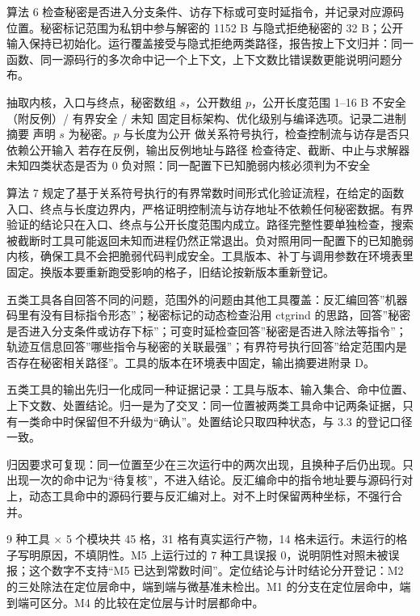 算法 6 检查秘密是否进入分支条件、访存下标或可变时延指令，并记录对应源码位置。秘密标记范围为私钥中参与解密的 1152 B 与隐式拒绝秘密的 32 B；公开输入保持已初始化。运行覆盖接受与隐式拒绝两类路径，报告按上下文归并：同一函数、同一源码行的多次命中记一个上下文，上下文数比错误数更能说明问题分布。

\begin{algorithm}[H]
\caption{Binsec 有界常数时间检查}
\label{alg:binsec}
\begin{algorithmic}[1]
\Require 抽取内核，入口与终点，秘密数组 $s$，公开数组 $p$，公开长度范围 1--16 B
\Ensure 不安全（附反例）/ 有界安全 / 未知
\State 固定目标架构、优化级别与编译选项。记录二进制摘要
\State 声明 $s$ 为秘密。$p$ 与长度为公开
\State 做关系符号执行，检查控制流与访存是否只依赖公开输入
\State 若存在反例，输出反例地址与路径
\State 检查待定、截断、中止与求解器未知四类状态是否为 0
\State 负对照：同一配置下已知脆弱内核必须判为不安全
\end{algorithmic}
\end{algorithm}

算法 7 规定了基于关系符号执行的有界常数时间形式化验证流程，在给定的函数入口、终点与长度边界内，严格证明控制流与访存地址不依赖任何秘密数据。有界验证的结论只在入口、终点与公开长度范围内成立。路径完整性要单独检查，搜索被截断时工具可能返回未知而进程仍然正常退出。负对照用同一配置下的已知脆弱内核，确保工具不会把脆弱代码判成安全。工具版本、补丁与调用参数在环境表里固定。换版本要重新跑受影响的格子，旧结论按新版本重新登记。

五类工具各自回答不同的问题，范围外的问题由其他工具覆盖：反汇编回答”机器码里有没有目标指令形态”；秘密标记的动态检查沿用 ctgrind 的思路，回答”秘密是否进入分支条件或访存下标”；可变时延检查回答”秘密是否进入除法等指令”；轨迹互信息回答”哪些指令与秘密的关联最强”；有界符号执行回答”给定范围内是否存在秘密相关路径”。工具的版本在环境表中固定，输出摘要进附录 D。

五类工具的输出先归一化成同一种证据记录：工具与版本、输入集合、命中位置、上下文数、处置结论。归一是为了交叉：同一位置被两类工具命中记两条证据，只有一类命中时保留但不升级为“确认”。处置结论只取四种状态，与 3.3 的登记口径一致。

归因要求可复现：同一位置至少在三次运行中的两次出现，且换种子后仍出现。只出现一次的命中记为“待复核”，不进入结论。反汇编命中的指令地址要与源码行对上，动态工具命中的源码行要与反汇编对上。对不上时保留两种坐标，不强行合并。

9 种工具 × 5 个模块共 45 格，31 格有真实运行产物，14 格未运行。未运行的格子写明原因，不填阴性。M5 上运行过的 7 种工具误报 0，说明阴性对照未被误报；这个数字不支持“M5 已达到常数时间”。定位结论与计时结论分开登记：M2 的三处除法在定位层命中，端到端与微基准未检出。M1 的分支在定位层命中，端到端可区分。M4 的比较在定位层与计时层都命中。 %

